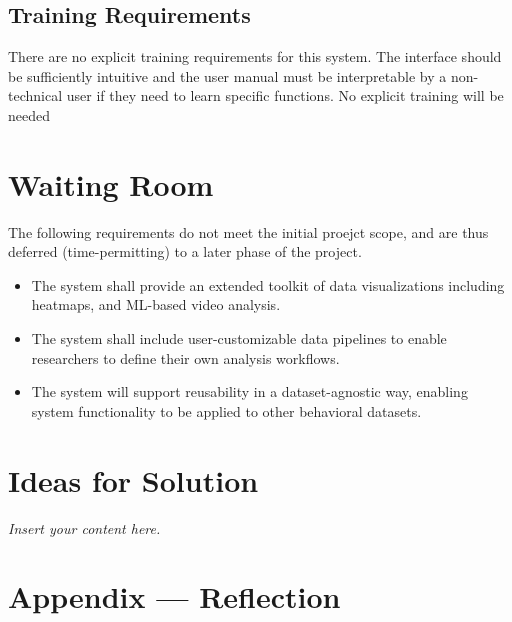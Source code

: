 \documentclass[12pt]{article}
\newcommand{\lips}{\textit{Insert your content here.}}
\begin{document}
\subsection{Training Requirements}

\par{ There are no explicit training requirements for this system. The interface should be sufficiently intuitive and the user manual must be interpretable by a non-technical user if they need to learn specific functions.
No explicit training will be needed }

\section{Waiting Room}

\par{The following requirements do not meet the initial proejct scope, and are thus deferred (time-permitting) to a later phase of the project. }

\begin{itemize}
    \item The system shall provide an extended toolkit of data visualizations including heatmaps, and ML-based video analysis.
    \item The system shall include user-customizable data pipelines to enable researchers to define their own analysis workflows.
    \item The system will support reusability in a dataset-agnostic way, enabling system functionality to be applied to other behavioral datasets.
\end{itemize}


\section{Ideas for Solution}
\lips

\newpage{}
\section*{Appendix --- Reflection}




\end{document}
